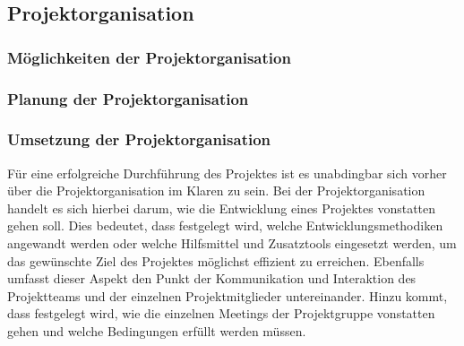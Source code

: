 \subsection{Projektorganisation}
\label{sec:Projektorganisation}

\subsubsection*{Möglichkeiten der Projektorganisation}
\label{sec:MoeglichkeitenProjektorganisation}


\subsubsection*{Planung der Projektorganisation}
\label{sec:PlanungProjektorganisation}

\subsubsection*{Umsetzung der Projektorganisation}
\label{sec:UmsetzungProjektorganisation}

Für eine erfolgreiche Durchführung des Projektes ist es unabdingbar sich vorher
über die Projektorganisation im Klaren zu sein. Bei der Projektorganisation
handelt es sich hierbei darum, wie die Entwicklung eines Projektes vonstatten
gehen soll. Dies bedeutet, dass festgelegt wird, welche Entwicklungsmethodiken
angewandt werden oder welche Hilfsmittel und Zusatztools eingesetzt werden, um
das gewünschte Ziel des Projektes möglichst effizient zu erreichen. Ebenfalls
umfasst dieser Aspekt den Punkt der Kommunikation und Interaktion des
Projektteams und der einzelnen Projektmitglieder untereinander. Hinzu kommt,
dass festgelegt wird, wie die einzelnen Meetings der Projektgruppe vonstatten
gehen und welche Bedingungen erfüllt werden müssen.

